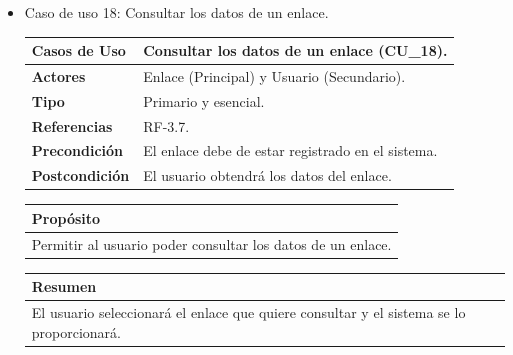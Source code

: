\begin{itemize}
\begin{table}[h!]
        \caption{Caso de uso 17: Consultar enlaces.}
        \label{table:caso-de-uso-17}
    \end{table}
    
    \newpage

    \item Caso de uso 18: Consultar los datos de un enlace.
    
    \begin{table}[h!]
        \centering
        \begin{tabular}{|l|p{}|}
            \hline
            \textbf{Casos de Uso}   &   Consultar los datos de un enlace (CU\_18). \\
            \hline 
            \textbf{Actores}        &   Enlace (Principal) y Usuario (Secundario). \\ 
            \hline 
            \textbf{Tipo}           &   Primario y esencial. \\
            \hline
            \textbf{Referencias}    &   RF-3.7. \\ 
            \hline
            \textbf{Precondición}   &   El enlace debe de estar registrado en el sistema. \\ 
            \hline
            \textbf{Postcondición}  &   El usuario obtendrá los datos del enlace. \\ 
            \hline
        \end{tabular}
        
        \vspace{5mm}
        
        \begin{tabular}{|p{\textwidth}|}
            \hline
            \rowcolor{SeaGreen} \textbf{Propósito} \\
            \hline
            \multicolumn{1}{|p{12cm}|}{Permitir al usuario poder consultar los datos de un enlace.} \\ [0.5ex]
            \hline
        \end{tabular}
        
        \vspace{5mm}
        
        \begin{tabular}{|p{\textwidth}|}
            \hline
            \rowcolor{SeaGreen} \textbf{Resumen} \\
            \hline
            \multicolumn{1}{|p{12cm}|}{El usuario seleccionará el enlace que quiere consultar y el sistema se lo 
            proporcionará.} \\ [0.5ex]
            \hline
        \end{tabular}
        

\end{table}
\end{itemize}
